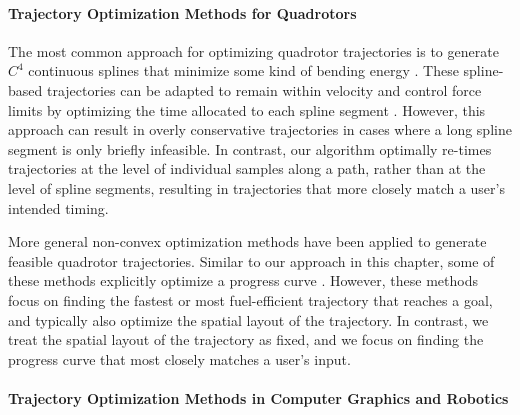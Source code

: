 \paragraph{Trajectory Optimization Methods for Quadrotors}


The most common approach for optimizing quadrotor trajectories is to generate $C^4$ continuous splines that minimize some kind of bending energy \cite{mellinger:2011,bry:2015,deits:2015,joubert:2015}.
These spline-based trajectories can be adapted to remain within velocity and control force limits by optimizing the time allocated to each spline segment \cite{mellinger:2011,bry:2015}.
However, this approach can result in overly conservative trajectories in cases where a long spline segment is only briefly infeasible.
In contrast, our algorithm optimally re-times trajectories at the level of individual samples along a path, rather than at the level of spline segments, resulting in trajectories that more closely match a user's intended timing.

More general non-convex optimization methods have been applied to generate feasible quadrotor trajectories.
Similar to our approach in this chapter, some of these methods explicitly optimize a progress curve \cite{cowling:2007,bouktir:2008,vanloock:2013}.
However, these methods focus on finding the fastest or most fuel-efficient trajectory that reaches a goal, and typically also optimize the spatial layout of the trajectory.
In contrast, we treat the spatial layout of the trajectory as fixed, and we focus on finding the progress curve that most closely matches a user's input.

\paragraph{Trajectory Optimization Methods in Computer Graphics and Robotics}

